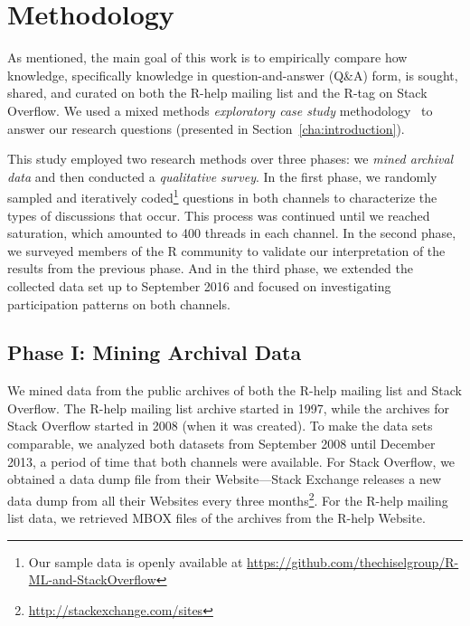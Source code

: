 \documentclass[smallextended]{svjour3}       %
\newcommand{\SO}{Stack Overflow\xspace}
\newcommand{\RH}{R-help\xspace}
\begin{document}
\section{Methodology}
\label{cha:methodology}

As mentioned, the main goal of this work is to empirically compare how knowledge, specifically knowledge in question-and-answer (Q\&A) form, is sought, shared, and curated on both the \RH mailing list and the R-tag on \SO. We used a mixed methods \textit{exploratory case study} methodology~\cite{Creswell2009,Runeson2012} to answer our research questions (presented in Section~\ref{cha:introduction}).
                    
This study employed two research methods over three phases: we \textit{mined archival data} and then conducted a \textit{qualitative survey}. In the first phase, we randomly sampled and iteratively coded\footnote{Our sample data is openly available at \url{https://github.com/thechiselgroup/R-ML-and-StackOverflow}} questions in both channels to characterize the types of discussions that occur. This process was continued until we reached saturation, which amounted to 400 threads in each channel. In the second phase, we surveyed members of the R community to validate our interpretation of the results from the previous phase. And in the third phase, we extended the collected data set up to September 2016 and focused on investigating participation patterns on both channels.

\subsection{Phase I: Mining Archival Data} 
\label{sec:studyDesign}

We mined data from the public archives of both the \RH mailing list and \SO. The \RH mailing list archive started in 1997, while the archives for \SO started in 2008 (when it was created).
To make the data sets comparable, we analyzed both datasets from September 2008 until December 2013, a period of time that both channels were available.
For \SO, we obtained a data dump file from their Website---Stack Exchange releases a new data dump from all their Websites every three months\footnote{\url{http://stackexchange.com/sites}}. For the \RH mailing list data, we retrieved MBOX files of the archives from the \RH Website.
\end{document}
